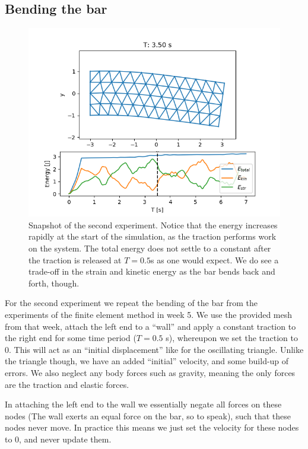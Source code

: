 \documentclass[sigconf]{acmart}
\begin{document}
\subsection{Bending the bar}
\begin{figure}
	\centering
	\includegraphics[width=\linewidth]{bar.png}
	\caption{Snapshot of the second experiment. Notice that the energy increases rapidly at the start of the simulation, as the traction performs work on the system. The total energy does not settle to a constant after the traction is released at $ T=0.5$s as one would expect. We do see a trade-off in the strain and kinetic energy as the bar bends back and forth, though.}
	\label{fig:bar}
\end{figure}
For the second experiment we repeat the bending of the bar from the experiments of the finite element method in week 5. We use the provided mesh from that week, attach the left end to a ``wall'' and apply a constant traction to the right end for some time period ($ T = 0.5  $ s), whereupon we set the traction to 0. This will act as an ``initial displacement'' like for the oscillating triangle. Unlike the triangle though, we have an added ``initial'' velocity, and some build-up of errors. We also neglect any body forces such as gravity, meaning the only forces are the traction and elastic forces.

In attaching the left end to the wall we essentially negate all forces on these nodes (The wall exerts an equal force on the bar, so to speak), such that these nodes never move. In practice this means we just set the velocity for these nodes to 0, and never update them.
\end{document}
